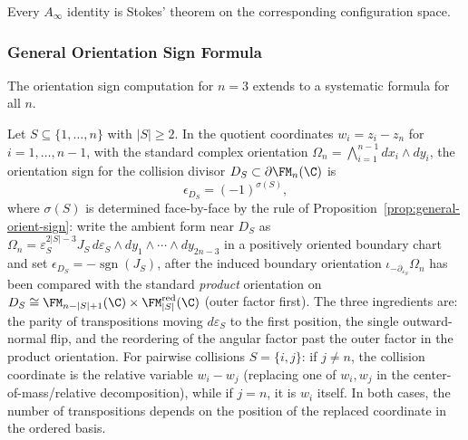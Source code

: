Every $A_\infty$ identity is Stokes' theorem on the corresponding configuration space.

\subsubsection{General Orientation Sign Formula}

The orientation sign computation for $n=3$ extends to a systematic formula for all $n$.

\begin{proposition}
\label{prop:general_sign_formula}
Let $S \subseteq \{1,\ldots,n\}$ with $|S| \geq 2$. In the quotient coordinates $w_i = z_i - z_n$ for $i = 1,\ldots,n-1$, with the standard complex orientation $\Omega_n = \bigwedge_{i=1}^{n-1} dx_i \wedge dy_i$, the orientation sign for the collision divisor $D_S \subset \partial\FM_n(\C)$ is
\begin{equation}
\label{eq:general_sign_fm_calculus}
\epsilon_{D_S} = (-1)^{\sigma(S)},
\end{equation}
where $\sigma(S)$ is determined face-by-face by the rule of Proposition~\ref{prop:general-orient-sign}: write the ambient form near $D_S$ as $\Omega_n = \varepsilon_S^{2|S|-3} J_S\, d\varepsilon_S \wedge dy_1\wedge\cdots\wedge dy_{2n-3}$ in a positively oriented boundary chart and set $\epsilon_{D_S} = -\operatorname{sgn}(J_S)$, after the induced boundary orientation $\iota_{-\partial_{\varepsilon_S}}\Omega_n$ has been compared with the standard \emph{product} orientation on $D_S \cong \FM_{n-|S|+1}(\C) \times \FM_{|S|}^{\mathrm{red}}(\C)$ (outer factor first). The three ingredients are: the parity of transpositions moving $d\varepsilon_S$ to the first position, the single outward-normal flip, and the reordering of the angular factor past the outer factor in the product orientation.
For pairwise collisions $S = \{i,j\}$: if $j \neq n$, the collision coordinate is the relative variable $w_i - w_j$ (replacing one of $w_i, w_j$ in the center-of-mass/relative decomposition), while if $j = n$, it is $w_i$ itself. In both cases, the number of transpositions depends on the position of the replaced coordinate in the ordered basis.
\end{proposition}

